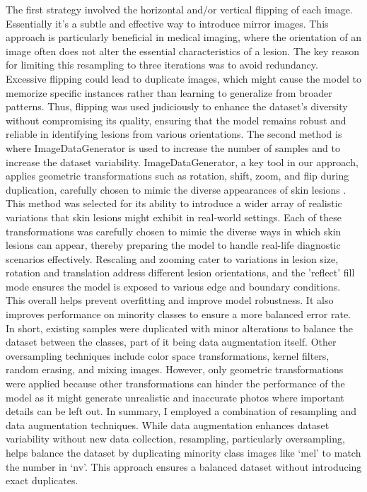 \documentclass[10pt,twocolumn]{article}
\begin{document}
\begin{enumerate}
    The first strategy involved the horizontal and/or vertical flipping of each image. Essentially it’s a subtle and effective way to introduce mirror images. This approach is particularly beneficial in medical imaging, where the orientation of an image often does not alter the essential characteristics of a lesion. The key reason for limiting this resampling to three iterations was to avoid redundancy. Excessive flipping could lead to duplicate images, which might cause the model to memorize specific instances rather than learning to generalize from broader patterns. Thus, flipping was used judiciously to enhance the dataset's diversity without compromising its quality, ensuring that the model remains robust and reliable in identifying lesions from various orientations. \newline \newline
    The second method is where ImageDataGenerator is used to increase the number of samples and to increase the dataset variability. ImageDataGenerator, a key tool in our approach, applies geometric transformations such as rotation, shift, zoom, and flip during duplication, carefully chosen to mimic the diverse appearances of skin lesions \cite{TensorFlow}. This method was selected for its ability to introduce a wider array of realistic variations that skin lesions might exhibit in real-world settings. Each of these transformations was carefully chosen to mimic the diverse ways in which skin lesions can appear, thereby preparing the model to handle real-life diagnostic scenarios effectively. Rescaling and zooming cater to variations in lesion size, rotation and translation address different lesion orientations, and the 'reflect' fill mode ensures the model is exposed to various edge and boundary conditions. This overall helps prevent overfitting and improve model robustness. It also improves performance on minority classes to ensure a more balanced error rate. In short, existing samples were duplicated with minor alterations to balance the dataset between the classes, part of it being data augmentation itself. \newline \newline
    Other oversampling techniques include color space transformations, kernel filters, random erasing, and mixing images. However, only geometric transformations were applied because other transformations can hinder the performance of the model as it might generate unrealistic and inaccurate photos where important details can be left out. In summary, I employed a combination of resampling and data augmentation techniques. While data augmentation enhances dataset variability without new data collection, resampling, particularly oversampling, helps balance the dataset by duplicating minority class images like ‘mel’ to match the number in ‘nv’. This approach ensures a balanced dataset without introducing exact duplicates.

\end{enumerate}
\end{document}
